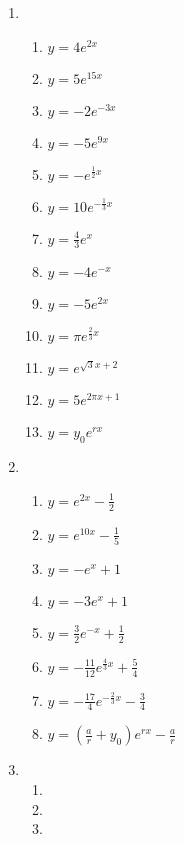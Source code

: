 \documentclass[a4paper]{article}
\begin{document}
\begin{enumerate}
\item %
  \begin{enumerate}
  \item $y = 4e^{2x}$ %
  \item $y = 5e^{15x}$ %
  \item $y = -2e^{-3x}$ %
  \item $y = -5e^{9x}$ %
  \item $y = -e^{\frac{1}{2}x}$ %
  \item $y = 10e^{-\frac{1}{3}x}$ %
  \item $y = \frac{4}{3}e^{x}$ %
  \item $y = -4e^{-x}$ %
  \item $y = -5e^{2x}$ %
  \item $y = \pi e^{\frac{2}{3}x}$ %
  \item $y = e^{\sqrt{3}x +2}$ %
  \item $y = 5e^{2\pi x+1}$ %
  \item $y = y_0e^{rx}$ %
  \end{enumerate}

\item %
  \begin{enumerate}
  \item $y = e^{2x} - \frac{1}{2}$ %
  \item $y = e^{10x} - \frac{1}{5}$ %
  \item $y = -e^{x} + 1$ %
  \item $y = -3e^{x} + 1$ %
  \item $y = \frac{3}{2}e^{-x} + \frac{1}{2}$ %
  \item $y = -\frac{11}{12}e^{\frac{4}{3}x} + \frac{5}{4}$ %
  \item $y = -\frac{17}{4}e^{-\frac{2}{3}x} - \frac{3}{4}$ %
  \item $y = (\frac{a}{r} + y_0)e^{rx} - \frac{a}{r}$ %
  \end{enumerate}

\item %

  \begin{enumerate}
  \item %
  \item %
  \item %
  \end{enumerate}
\end{enumerate}
\end{document}
